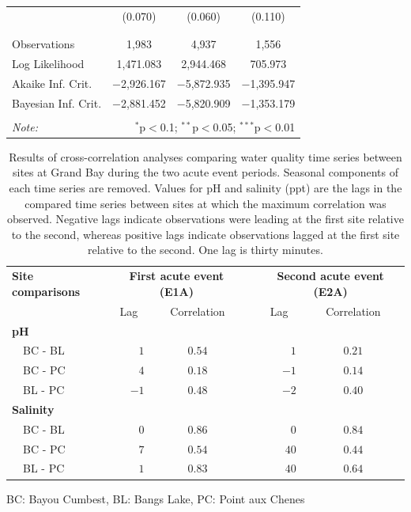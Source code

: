 \documentclass[letterpaper,12pt]{article}\usepackage[]{graphicx}\usepackage[]{color}
\begin{document}
\begin{table}[!htbp]
\begin{tabular}{@{\extracolsep{5pt}}lccc}
  & (0.070) & (0.060) & (0.110) \\ 
  & & & \\ 
\hline \\[-1.8ex] 
Observations & 1,983 & 4,937 & 1,556 \\ 
Log Likelihood & 1,471.083 & 2,944.468 & 705.973 \\ 
Akaike Inf. Crit. & $-$2,926.167 & $-$5,872.935 & $-$1,395.947 \\ 
Bayesian Inf. Crit. & $-$2,881.452 & $-$5,820.909 & $-$1,353.179 \\ 
\hline 
\hline \\[-1.8ex] 
\textit{Note:}  & \multicolumn{3}{r}{$^{*}$p$<$0.1; $^{**}$p$<$0.05; $^{***}$p$<$0.01} \\ 
\end{tabular} 
\end{table} 

\clearpage

\begin{table}[!tbp]
\caption{Results of cross-correlation analyses comparing water quality time series between sites at Grand Bay during the two acute event periods.  Seasonal components of each time series are removed.  Values for pH and salinity (ppt) are the lags in the compared time series between sites at which the maximum correlation was observed.  Negative lags indicate observations were leading at the first site relative to the second, whereas positive lags indicate observations lagged at the first site relative to the second.  One lag is thirty minutes.\label{tab:ccfwq}} 
\begin{center}
\begin{tabular}{lrccrc}
\hline\hline
\multicolumn{1}{l}{\bfseries Site comparisons}&\multicolumn{2}{c}{\bfseries First acute event (E1A)}&\multicolumn{1}{c}{\bfseries }&\multicolumn{2}{c}{\bfseries Second acute event (E2A)}\tabularnewline
\cline{2-3} \cline{5-6}
\multicolumn{1}{l}{}&\multicolumn{1}{c}{Lag}&\multicolumn{1}{c}{Correlation}&\multicolumn{1}{c}{}&\multicolumn{1}{c}{Lag}&\multicolumn{1}{c}{Correlation}\tabularnewline
\hline
{\bfseries pH}&&&&&\tabularnewline
~~BC - BL&$ 1$&$0.54$&&$ 1$&$0.21$\tabularnewline
~~BC - PC&$ 4$&$0.18$&&$-1$&$0.14$\tabularnewline
~~BL - PC&$-1$&$0.48$&&$-2$&$0.40$\tabularnewline
\hline
{\bfseries Salinity}&&&&&\tabularnewline
~~BC - BL&$ 0$&$0.86$&&$ 0$&$0.84$\tabularnewline
~~BC - PC&$ 7$&$0.54$&&$40$&$0.44$\tabularnewline
~~BL - PC&$ 1$&$0.83$&&$40$&$0.64$\tabularnewline
\hline
\end{tabular}\end{center}

\footnotesize BC: Bayou Cumbest, BL: Bangs Lake, PC: Point aux Chenes\end{table}
\end{document}
